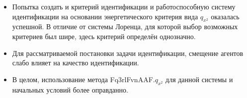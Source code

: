 \begin{itemize}

  \item
    Попытка создать и критерий идентификации и работоспособную систему идентификации
    на основании энергетического критерия вида $q_{x^2}$ оказалась успешной. В отличие
    от системы Лоренца, для которой выбор возможных критериев был шире,
    здесь критерий определён однозначно.

  \item
    Для рассматриваемой постановки задачи идентификации,
    смещение агентов слабо влияет на качество идентификации.

  \item
    В целом, использование метода  Fq3rlFvnAAF.$q_{x^2}$ для данной системы
    и начальных условий более оправданно.

\end{itemize}




